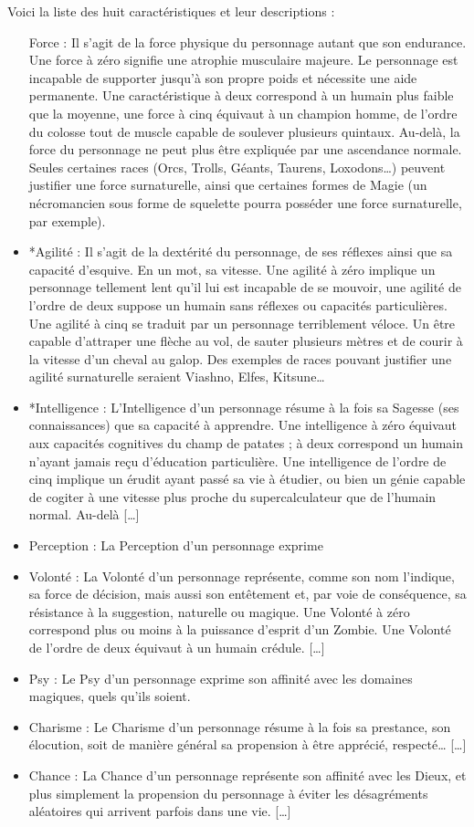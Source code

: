 Voici la liste des huit caractéristiques et leur descriptions :
\begin{itemize}
    \item[Force :] Il s’agit de la force physique du personnage autant que son endurance. Une force à zéro signifie une atrophie musculaire majeure. Le personnage est incapable de supporter jusqu’à son propre poids et nécessite une aide permanente. Une caractéristique à deux correspond à un humain plus faible que la moyenne, une force à cinq équivaut à un champion homme, de l’ordre du colosse tout de muscle capable de soulever plusieurs quintaux. Au-delà, la force du personnage ne peut plus être expliquée par une ascendance normale. Seules certaines races (Orcs, Trolls, Géants, Taurens, Loxodons…) peuvent justifier une force surnaturelle, ainsi que certaines formes de Magie (un nécromancien sous forme de squelette pourra posséder une force surnaturelle, par exemple).
    \item*{Agilité :} Il s’agit de la dextérité du personnage, de ses réflexes ainsi que sa capacité d’esquive. En un mot, sa vitesse. Une agilité à zéro implique un personnage tellement lent qu’il lui est incapable de se mouvoir, une agilité de l’ordre de deux suppose un humain sans réflexes ou capacités particulières. Une agilité à cinq se traduit par un personnage terriblement véloce. Un être capable d’attraper une flèche au vol, de sauter plusieurs mètres et de courir à la vitesse d’un cheval au galop. Des exemples de races pouvant justifier une agilité surnaturelle seraient Viashno, Elfes, Kitsune…
    \item*{Intelligence :} L’Intelligence d’un personnage résume à la fois sa Sagesse (ses connaissances) que sa capacité à apprendre. Une intelligence à zéro équivaut aux capacités cognitives du champ de patates ; à deux correspond un humain n’ayant jamais reçu d’éducation particulière. Une intelligence de l’ordre de cinq implique un érudit ayant passé sa vie à étudier, ou bien un génie capable de cogiter à une vitesse plus proche du supercalculateur que de l’humain normal. Au-delà […]
    \item{Perception :} La Perception d’un personnage exprime 
    \item{Volonté :} La Volonté d’un personnage représente, comme son nom l’indique, sa force de décision, mais aussi son entêtement et, par voie de conséquence, sa résistance à la suggestion, naturelle ou magique. Une Volonté à zéro correspond plus ou moins à la puissance d’esprit d’un Zombie. Une Volonté de l’ordre de deux équivaut à un humain crédule. […]
    \item{Psy :} Le Psy d’un personnage exprime son affinité avec les domaines magiques, quels qu’ils soient. 
    \item{Charisme :} Le Charisme d’un personnage résume à la fois sa prestance, son élocution, soit de manière général sa propension à être apprécié, respecté… […]
    \item{Chance :} La Chance d’un personnage représente son affinité avec les Dieux, et plus simplement la propension du personnage à éviter les désagréments aléatoires qui arrivent parfois dans une vie. […]
\end{itemize}

